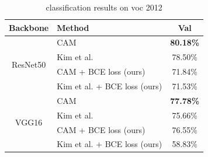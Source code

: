 \documentclass[conference]{IEEEtran}
\begin{document}
\begin{table}[t]
    \centering
    \caption{classification results on voc 2012}
    \label{tab:classification_map_voc_2012}
    \begin{tabular}{|c|l|c|}
        \hline
        Backbone                     & Method                                              & Val                             \\
        \hline
        \multirow[c]{4}{*}{ResNet50} & CAM\cite{zhou2015cnnlocalization}                   & \color{red} \bfseries{80.18\%}  \\
                                     & Kim et al. \cite{kim2022bridging}                   & 78.50\%                         \\
                                     & CAM\cite{zhou2015cnnlocalization} + BCE loss (ours) & 71.84\%                         \\
                                     & Kim et al. \cite{kim2022bridging} + BCE loss (ours) & 71.53\%                         \\
        \hline
        \multirow[c]{4}{*}{VGG16}    & CAM\cite{zhou2015cnnlocalization}                   & \color{blue} \bfseries{77.78\%} \\
                                     & Kim et al. \cite{kim2022bridging}                   & 75.66\%                         \\
                                     & CAM\cite{zhou2015cnnlocalization} + BCE loss (ours) & 76.55\%                         \\
                                     & Kim et al. \cite{kim2022bridging} + BCE loss (ours) & 58.83\%                         \\
        \hline
    \end{tabular}
\end{table}
\end{document}
